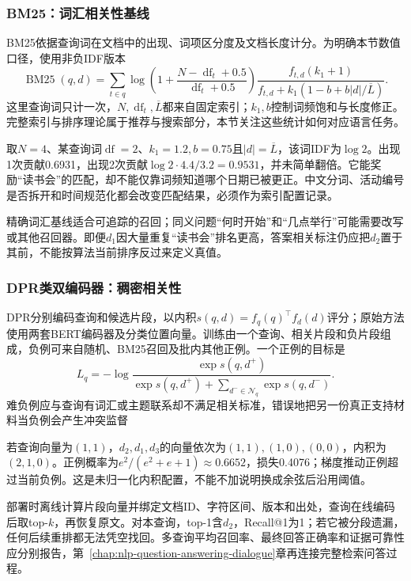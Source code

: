 \subsubsection{BM25：词汇相关性基线}
\label{sec:nlp-classification-bm25}

BM25依据查询词在文档中的出现、词项区分度及文档长度计分。为明确本节数值口径，使用非负IDF版本
\[
 \operatorname{BM25}(q,d)=
 \sum_{t\in q}
 \log\!\left(1+\frac{N-\operatorname{df}_t+0.5}
                       {\operatorname{df}_t+0.5}\right)
 \frac{f_{t,d}(k_1+1)}
 {f_{t,d}+k_1(1-b+b|d|/\overline L)}.
\]
这里查询词只计一次，$N,\operatorname{df}_t,\overline L$都来自固定索引；$k_1,b$控制词频饱和与长度修正。完整索引与排序理论属于推荐与搜索部分，本节关注这些统计如何对应语言任务。

取$N=4$、某查询词$\operatorname{df}=2$、$k_1=1.2,b=0.75$且$|d|=\overline L$，该词IDF为$\log2$。出现1次贡献0.6931，出现2次贡献$\log2\cdot4.4/3.2=0.9531$，并未简单翻倍。它能奖励“读书会”的匹配，却不能仅靠词频知道哪个日期已被更正。中文分词、活动编号是否拆开和时间规范化都会改变匹配结果，必须作为索引配置记录。

精确词汇基线适合可追踪的召回；同义问题“何时开始”和“几点举行”可能需要改写或其他召回器。即便$d_1$因大量重复“读书会”排名更高，答案相关标注仍应把$d_2$置于其前，不能按算法当前排序反过来定义真值。

\subsubsection{DPR类双编码器：稠密相关性}
\label{sec:nlp-classification-dpr}

DPR分别编码查询和候选片段，以内积$s(q,d)=f_q(q)^\top f_d(d)$评分；原始方法使用两套BERT编码器及分类位置向量。训练由一个查询、相关片段和负片段组成，负例可来自随机、BM25召回及批内其他正例。一个正例的目标是
\[
  L_q=-\log\frac{\exp s(q,d^+)}
  {\exp s(q,d^+)+\sum_{d^-\in\mathcal N_q}\exp s(q,d^-)}.
\]
难负例应与查询有词汇或主题联系却不满足相关标准，错误地把另一份真正支持材料当负例会产生冲突监督

若查询向量为$(1,1)$，$d_2,d_1,d_3$的向量依次为$(1,1),(1,0),(0,0)$，内积为$(2,1,0)$。正例概率为$e^2/(e^2+e+1)\approx0.6652$，损失0.4076；梯度推动正例超过当前负例。这是未归一化内积配置，不能不加说明换成余弦后沿用阈值。

部署时离线计算片段向量并绑定文档ID、字符区间、版本和出处，查询在线编码后取top-$k$，再恢复原文。对本查询，top-1含$d_2$，Recall@1为1；若它被分段遗漏，任何后续重排都无法凭空找回。多查询平均召回率、最终回答正确率和证据可靠性应分别报告，第~\ref{chap:nlp-question-answering-dialogue}章再连接完整检索问答过程。

